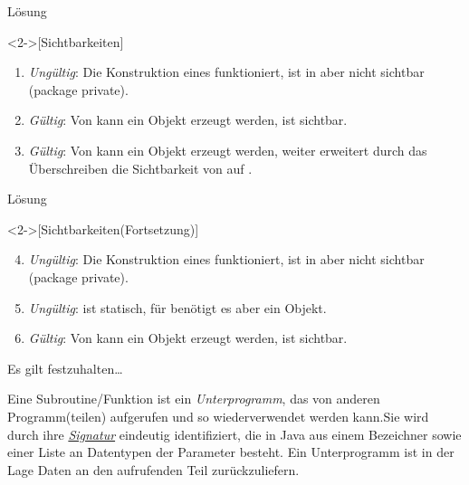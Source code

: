 \begin{frame}[c]{Lösung}
    \begin{solve}<2->[Sichtbarkeiten]
       \begin{enumerate}[<+(1)->]
            \item \emph{Ungültig}: Die Konstruktion eines  funktioniert,  ist in  aber nicht sichtbar (package private).
            \item \emph{Gültig}: Von  kann ein Objekt erzeugt werden,  ist  sichtbar.
            \item \emph{Gültig}: Von  kann ein Objekt erzeugt werden, weiter erweitert  durch das Überschreiben die Sichtbarkeit von  auf .
       \end{enumerate}
    \end{solve}
\end{frame}

\begin{frame}[c]{Lösung}
    \addtocounter{solve}{-1}%
    \begin{solve}<2->[Sichtbarkeiten\hfill(Fortsetzung)]
       \begin{enumerate}[<+(1)->]
            \setcounter{enumi}{3}
           \item \emph{Ungültig}: Die Konstruktion eines  funktioniert,  ist in  aber nicht sichtbar (package private).
           \item \emph{Ungültig}:  ist statisch, für  benötigt es aber ein Objekt.
           \item \emph{Gültig}: Von  kann ein Objekt erzeugt werden,  ist  sichtbar.
       \end{enumerate}
    \end{solve}
\end{frame}
\fi

\begin{frame}[c]{Es gilt festzuhalten\ldots}
    \begin{definition}[Subroutinen]
        Eine Subroutine\thinspace /\thinspace Funktion ist ein \emph{Unterprogramm},\pause{} das von anderen Programm(teilen) aufgerufen und so wiederverwendet werden kann.\pause{}\medskip\newline Sie wird durch ihre \hyperlink{mrk:Signatur}{\emph{Signatur}} eindeutig identifiziert,\pause{} die in Java aus einem Bezeichner sowie einer Liste an Datentypen der Parameter besteht. Ein Unterprogramm ist in der Lage Daten an den aufrufenden Teil zurückzuliefern.
    \end{definition}
\end{frame}

